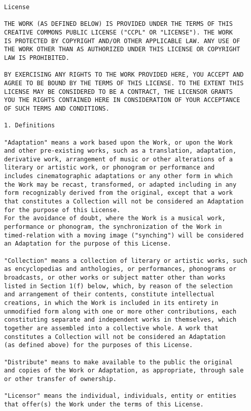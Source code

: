 \begin{verbatim}
License

THE WORK (AS DEFINED BELOW) IS PROVIDED UNDER THE TERMS OF THIS 
CREATIVE COMMONS PUBLIC LICENSE ("CCPL" OR "LICENSE"). THE WORK
IS PROTECTED BY COPYRIGHT AND/OR OTHER APPLICABLE LAW. ANY USE OF
THE WORK OTHER THAN AS AUTHORIZED UNDER THIS LICENSE OR COPYRIGHT
LAW IS PROHIBITED.

BY EXERCISING ANY RIGHTS TO THE WORK PROVIDED HERE, YOU ACCEPT AND
AGREE TO BE BOUND BY THE TERMS OF THIS LICENSE. TO THE EXTENT THIS
LICENSE MAY BE CONSIDERED TO BE A CONTRACT, THE LICENSOR GRANTS
YOU THE RIGHTS CONTAINED HERE IN CONSIDERATION OF YOUR ACCEPTANCE
OF SUCH TERMS AND CONDITIONS.

1. Definitions

"Adaptation" means a work based upon the Work, or upon the Work
and other pre-existing works, such as a translation, adaptation,
derivative work, arrangement of music or other alterations of a
literary or artistic work, or phonogram or performance and
includes cinematographic adaptations or any other form in which
the Work may be recast, transformed, or adapted including in any
form recognizably derived from the original, except that a work
that constitutes a Collection will not be considered an Adaptation
for the purpose of this License.
For the avoidance of doubt, where the Work is a musical work,
performance or phonogram, the synchronization of the Work in
timed-relation with a moving image ("synching") will be considered
an Adaptation for the purpose of this License.

"Collection" means a collection of literary or artistic works, such
as encyclopedias and anthologies, or performances, phonograms or
broadcasts, or other works or subject matter other than works
listed in Section 1(f) below, which, by reason of the selection
and arrangement of their contents, constitute intellectual
creations, in which the Work is included in its entirety in
unmodified form along with one or more other contributions, each
constituting separate and independent works in themselves, which
together are assembled into a collective whole. A work that
constitutes a Collection will not be considered an Adaptation
(as defined above) for the purposes of this License.

"Distribute" means to make available to the public the original
and copies of the Work or Adaptation, as appropriate, through sale
or other transfer of ownership.

"Licensor" means the individual, individuals, entity or entities
that offer(s) the Work under the terms of this License.


\end{verbatim}
